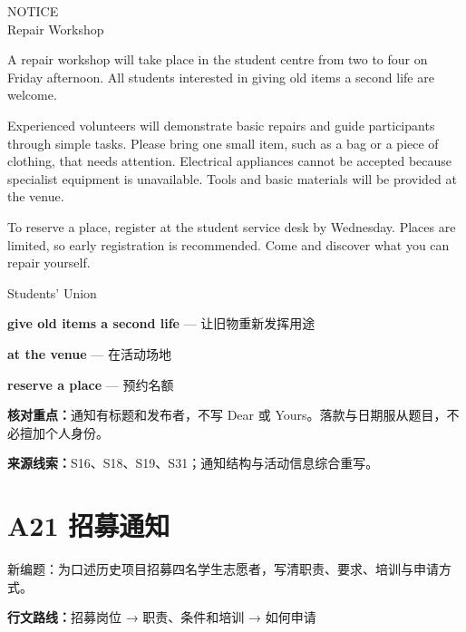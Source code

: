 \documentclass[11pt,a4paper,fontset=macnew]{ctexart}
\newenvironment{example}{\begingroup\fontsize{11}{14.3}\selectfont\setlength{\parskip}{4pt}}{\par\endgroup}
\begin{document}
\begin{example}
{\centering NOTICE\\Repair Workshop\par}
A repair workshop will take place in the student centre from two to four on Friday afternoon. All students interested in giving old items a second life are welcome.

Experienced volunteers will demonstrate basic repairs and guide participants through simple tasks. Please bring one small item, such as a bag or a piece of clothing, that needs attention. Electrical appliances cannot be accepted because specialist equipment is unavailable. Tools and basic materials will be provided at the venue.

To reserve a place, register at the student service desk by Wednesday. Places are limited, so early registration is recommended. Come and discover what you can repair yourself.

\noindent Students' Union\par
\end{example}
\par\vspace{4pt}{\bfseries 好词好句：优先记这三处}\par\nopagebreak
{\small\textbf{give old items a second life} — 让旧物重新发挥用途}\par
{\small\textbf{at the venue} — 在活动场地}\par
{\small\textbf{reserve a place} — 预约名额}\par
{\small\textbf{核对重点：}通知有标题和发布者，不写 Dear 或 Yours。落款与日期服从题目，不必擅加个人身份。}\par
{\fontsize{8}{10}\selectfont\textbf{来源线索：}S16、S18、S19、S31；通知结构与活动信息综合重写。}\par
\clearpage\section*{A21  招募通知}
{\small 新编题：为口述历史项目招募四名学生志愿者，写清职责、要求、培训与申请方式。}\par
{\small\textbf{行文路线：}招募岗位 → 职责、条件和培训 → 如何申请}\par
\par\vspace{4pt}{\bfseries 可替换模板}\par\nopagebreak
\end{document}
